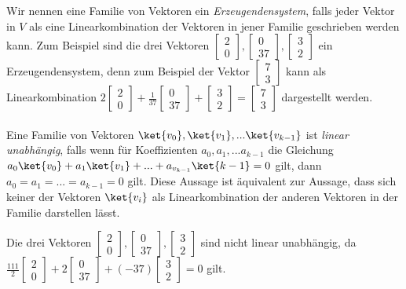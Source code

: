 Wir nennen eine Familie von Vektoren ein \textit{Erzeugendensystem}, falls jeder Vektor in $V$ als eine Linearkombination der Vektoren in jener Familie geschrieben werden kann. Zum Beispiel sind die drei Vektoren $\begin{bmatrix}2 \\ 0\end{bmatrix}, \begin{bmatrix} 0 \\ 37\end{bmatrix}, \begin{bmatrix}3 \\ 2\end{bmatrix}$ ein Erzeugendensystem, denn zum Beispiel der Vektor $\begin{bmatrix}7 \\ 3\end{bmatrix}$ kann als Linearkombination $2\begin{bmatrix}2 \\ 0\end{bmatrix} + \frac{1}{37}\begin{bmatrix} 0 \\ 37\end{bmatrix} + \begin{bmatrix}3 \\ 2\end{bmatrix} = \begin{bmatrix}7 \\ 3\end{bmatrix}$ dargestellt werden.
\paragraph{}
Eine Familie von Vektoren $\ket{v_0}, \ket{v_1}, ... \ket{v_{k - 1}}$ ist \textit{linear unabhängig}, falls wenn für Koeffizienten $a_0, a_1, ... a_{k - 1}$ die Gleichung $a_0\ket{v_0} + a_1\ket{v_1} + ... + a_{v_{k - 1}}\ket{k - 1} = 0$ gilt, dann $a_0 = a_1 = ... = a_{k - 1} = 0$ gilt. Diese Aussage ist äquivalent zur Aussage, dass sich keiner der Vektoren $\ket{v_{i}}$ als Linearkombination der anderen Vektoren in der Familie darstellen lässt.

Die drei Vektoren $\begin{bmatrix}2 \\ 0\end{bmatrix}, \begin{bmatrix} 0 \\ 37\end{bmatrix}, \begin{bmatrix}3 \\ 2\end{bmatrix}$ sind nicht linear unabhängig, da $\frac{111}{2}\begin{bmatrix}2 \\ 0\end{bmatrix} + 2\begin{bmatrix} 0 \\ 37\end{bmatrix} + (-37)\begin{bmatrix}3 \\ 2\end{bmatrix} = 0$ gilt.
